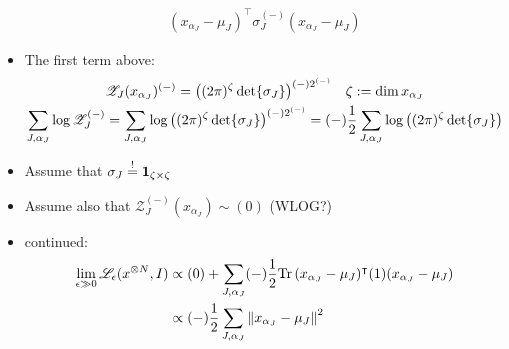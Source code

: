 \begin{frame}[t]
\begin{itemize}
{\begin{align*}
                     { ( x _{\alpha _{J}}
                        - \mu _{J}
                       ) ^{\intercal}
                       \sigma _{J} ^{(-)}
                       ( x _{\alpha _{J}}
                        - \mu _{J}
                       ) 
                     }
          \end{align*}
          }
      \item The first term above:
          { \footnotesize
          \begin{gather*}
             \mathscr{Z} 
               _{J} (x _{\alpha _{J}}) 
               ^{(-)}
            = 
              \big( 
                 (2 \pi) 
                  ^{\zeta}
                 \det { \sigma _{J} }
              \big) 
               ^{(-) 2 ^{(-)}} 
             \quad 
              \zeta := \dim 
                        {x _{\alpha _{J}}}
            \\ 
              \sum _{J, \alpha _{J}}
              \textnormal{log}\,   
                \mathscr {Z} _{J} ^{(-)}  
            =
              \sum _{J, \alpha _{J}}
              \textnormal{log}\, 
              \big( 
                 (2 \pi) 
                  ^{\zeta}
                 \det { \sigma _{J} }
              \big) 
               ^{(-) 2 ^{(-)}}  
            =
             (-) \frac {1} {2}
             \sum _{J, \alpha _{J}}
             \textnormal{log}\, 
             \big( 
                 (2 \pi) ^{\zeta}
                 \det { \sigma _{J} }
             \big) 
          \end{gather*}
          }
      \item Assume that  
        $ \sigma _{J} \overset {!} {=} 
          \mathbf {1} _{\zeta \times \zeta}
        $
      \item Assume also that 
        $ \mathscr {Z} 
            ^{(-)} _{J} (x _{\alpha _{J}})
         \sim 
          (0)
        $ (WLOG?) 
  \end{itemize}
\end{frame}


\begin{frame} [t]
\begin{itemize}
    \item continued: 
    { \footnotesize 
    \begin{align*}
      \lim _{\epsilon \gg 0}
        \mathscr {L} _{\epsilon} 
         (x ^{\otimes N}, I) 
     & \propto 
          (0) 
         +
          \sum _{J, \alpha _{J}}
          (-) \frac {1} {2} 
                \textnormal{Tr\,} 
                 { ( x _{\alpha _{J}}
                    - \mu _{J}
                   ) ^{\intercal}
                   (1)
                   ( x _{\alpha _{J}}
                    - \mu _{J}
                   ) 
                 }
     \\ & \propto
          (-) \frac {1} {2} 
          \sum _{J, \alpha _{J}}
          \norm 
             { x _{\alpha _{J}}
               - \mu _{J}
             } ^{2} 
    \end{align*}
    }
\end{itemize}    
\end{frame}


